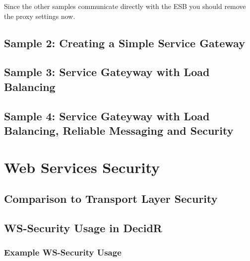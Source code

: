 Since the other samples communicate directly with the ESB you should remove the
proxy settings now.

\subsection{Sample 2: Creating a Simple Service Gateway}
\label{sec:sample-2}

\subsection{Sample 3: Service Gateyway with Load Balancing}
\label{sec:sample-3}

\subsection{Sample 4: Service Gateyway with Load Balancing, Reliable Messaging
and Security}
\label{sec:sample-4}

\section{Web Services Security}
\label{chap:web-services-security}

\subsection{Comparison to Transport Layer Security}
\label{sec:comparison-to-transport-layer-securtiy}

\subsection{WS-Security Usage in DecidR}
\label{subsec:ws-security-usage-in-decidr}

\subsubsection{Example WS-Security Usage}
\label{subsec:example-ws-security-usage}
